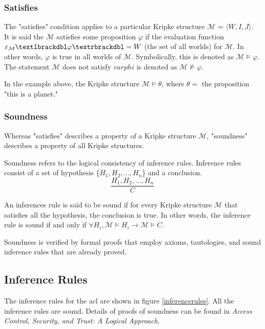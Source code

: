 \documentclass[../../main/main.tex]{subfiles}
\begin{document}
\subsubsection{Satisfies}\label{sssec:satisfies}
The "satisfies" condition applies to a particular Kripke structure $\mathcal{M}$ = $\langle \textit{W}, \textit{I}, \textit{J} \rangle $.  It is said the $\mathcal{M}$ satisfies some proposition $\varphi$ if the evaluation function $\varepsilon_{\mathcal{M}}\textlbrackdbl \varphi \textrbrackdbl = W$ (the set of all worlds) for  $\mathcal{M}$.  In other words, $\varphi$ is true in all worlds of $\mathcal{M}$.  Symbolically, this is denoted as $\mathcal{M} \models \varphi$.  The statement $\mathcal{M}$ does not satisfy $varphi$ is denoted as $\mathcal{M} \not\models \varphi$.

In the example above, the Kripke structure $\mathcal{M} \models \theta$, where $\theta =$ the proposition "this is a planet."

\subsubsection{Soundness}\label{sssec:soundness}
Whereas "satisfies" describes a property of a Kripke structure $\mathcal{M}$, "soundness" describes a property of all Kripke structures. 

Soundness refers to the logical consistency of inference rules.  Inference rules consist of a set of hypothesis \{$H_1, H_2, \dots , H_n$\} and a conclusion. 
\begin{equation*}
\frac{H_1, H_2, \dots , H_n}{C}
\end{equation*}

An inferences rule is said to be sound if for every Kripke structure $\mathcal{M}$ that satisfies all the hypothesis, the conclusion is true. In other words,  the inference rule is sound if and only if $\forall H_i, \mathcal{M} \models H_i \longrightarrow \mathcal{M} \models C$.

Soundness is verified by formal proofs that employ axioms, tautologies, and sound inference rules that are already proved.  

\subsection{Inference Rules}\label{ssec:inferencerules}
The inference rules for the \gls{acl} are shown in figure \ref{inferencerules}.  All the inference rules are sound.  Details of proofs of soundness can be found in \textit{Access Control, Security, and Trust: A Logical Approach}\cite{ChinOlder}.
\end{document}
